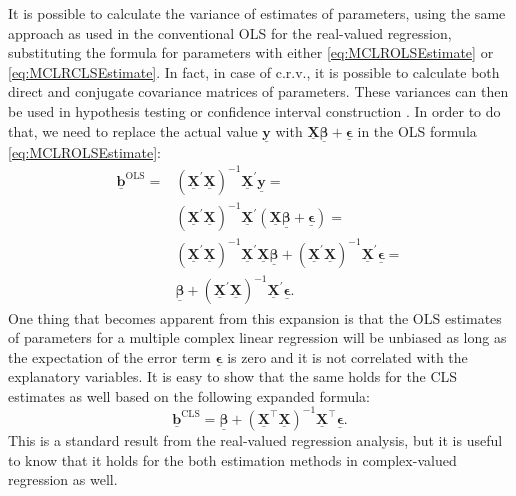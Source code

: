 \documentclass[
]{book}
\begin{document}
It is possible to calculate the variance of estimates of parameters, using the same approach as used in the conventional OLS for the real-valued regression, substituting the formula for parameters with either \eqref{eq:MCLROLSEstimate} or \eqref{eq:MCLRCLSEstimate}. In fact, in case of c.r.v., it is possible to calculate both direct and conjugate covariance matrices of parameters. These variances can then be used in hypothesis testing or confidence interval construction \citep[their distribution was studied by][]{Tavares2007}. In order to do that, we need to replace the actual value \(\underline{\mathbf{y}}\) with \(\underline{\mathbf{X}} \underline{\boldsymbol{\beta}} + \underline{\boldsymbol{\epsilon}}\) in the OLS formula \eqref{eq:MCLROLSEstimate}:
\begin{equation}
    \begin{aligned}
    \underline{\boldsymbol{b}}^{\text{OLS}} =
        & \left( \underline{\mathbf{X}}^\prime \underline{\mathbf{X}} \right)^{-1} \underline{\mathbf{X}}^\prime \underline{\mathbf{y}} = \\
        & \left( \underline{\mathbf{X}}^\prime \underline{\mathbf{X}} \right)^{-1} \underline{\mathbf{X}}^\prime (\underline{\mathbf{X}} \underline{\boldsymbol{\beta}} + \underline{\boldsymbol{\epsilon}}) = \\
        & \left( \underline{\mathbf{X}}^\prime \underline{\mathbf{X}} \right)^{-1} \underline{\mathbf{X}}^\prime \underline{\mathbf{X}} \underline{\boldsymbol{\beta}} + \left( \underline{\mathbf{X}}^\prime \underline{\mathbf{X}} \right)^{-1} \underline{\mathbf{X}}^\prime \underline{\boldsymbol{\epsilon}} = \\
        & \underline{\boldsymbol{\beta}} + \left( \underline{\mathbf{X}}^\prime \underline{\mathbf{X}} \right)^{-1} \underline{\mathbf{X}}^\prime \underline{\boldsymbol{\epsilon}} .
    \end{aligned}
    \label{eq:MCLROLSExpansion}
\end{equation}
One thing that becomes apparent from this expansion is that the OLS estimates of parameters for a multiple complex linear regression will be unbiased as long as the expectation of the error term \(\underline{\boldsymbol{\epsilon}}\) is zero and it is not correlated with the explanatory variables. It is easy to show that the same holds for the CLS estimates as well based on the following expanded formula:
\begin{equation}
    \underline{\boldsymbol{b}}^{\text{CLS}} = \underline{\boldsymbol{\beta}} + \left( \underline{\mathbf{X}}^\top \underline{\mathbf{X}} \right)^{-1} \underline{\mathbf{X}}^\top \underline{\boldsymbol{\epsilon}} .
    \label{eq:MCLRCLSExpansion}
\end{equation}
This is a standard result from the real-valued regression analysis, but it is useful to know that it holds for the both estimation methods in complex-valued regression as well.
\end{document}
